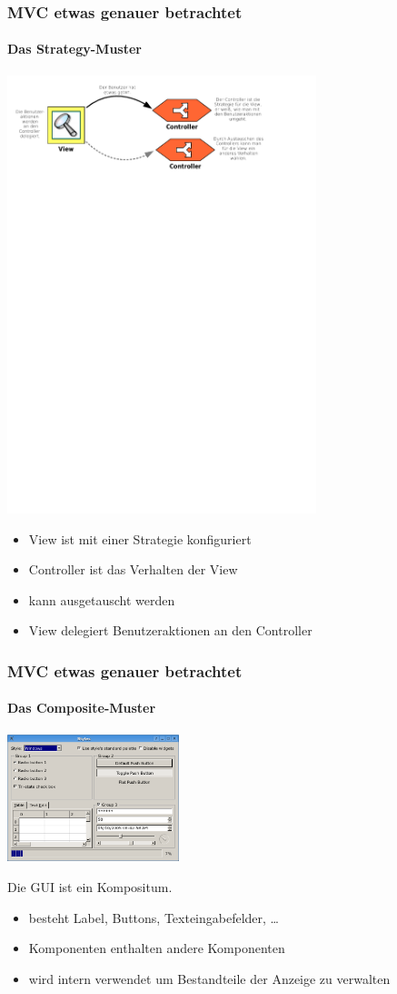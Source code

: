\begin{frame}
	\frametitle{MVC etwas genauer betrachtet}
	\framesubtitle{Das Strategy-Muster}
	\begin{center}
	\includegraphics[trim = 0mm 227.7mm 28.6mm 0mm, clip, width=9cm]{../mvc/strategy-schema.pdf}
	\end{center}	
	\begin{itemize}
		\item View ist mit einer Strategie konfiguriert
		\item Controller ist das Verhalten der View
		\item kann ausgetauscht werden
		\item View delegiert Benutzeraktionen an den Controller
	\end{itemize}
\end{frame}

\begin{frame}
	\frametitle{MVC etwas genauer betrachtet}
	\framesubtitle{Das Composite-Muster}
	\begin{center}
	\includegraphics[width=5cm]{gui.png}
	\end{center}	
	\begin{center}
		Die GUI ist ein Kompositum.
	\end{center}
	\begin{itemize}
		\item besteht Label, Buttons, Texteingabefelder, \dots
		\item Komponenten enthalten andere Komponenten
		\item wird intern verwendet um Bestandteile der Anzeige zu verwalten
	\end{itemize}
\end{frame}



